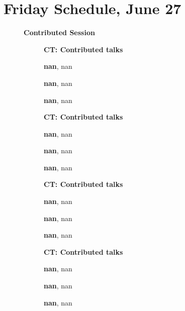 \documentclass[ILAS2025-program.tex]{subfiles}
\begin{document}
\section{Friday Schedule, June 27}
    
    \begin{description}
    \item[] \textbf{Contributed Session} 
    \begin{description}
    \item[] {\color{mstitle}\textbf{CT: Contributed talks}} 
    \item[] \textbf{nan}, nan
        \item[] \textbf{nan}, nan
        \item[] \textbf{nan}, nan
        \end{description}
    \begin{description}
    \item[] {\color{mstitle}\textbf{CT: Contributed talks}} 
    \item[] \textbf{nan}, nan
        \item[] \textbf{nan}, nan
        \item[] \textbf{nan}, nan
        \end{description}
    \begin{description}
    \item[] {\color{mstitle}\textbf{CT: Contributed talks}} 
    \item[] \textbf{nan}, nan
        \item[] \textbf{nan}, nan
        \item[] \textbf{nan}, nan
        \end{description}
    \begin{description}
    \item[] {\color{mstitle}\textbf{CT: Contributed talks}} 
    \item[] \textbf{nan}, nan
        \item[] \textbf{nan}, nan
        \item[] \textbf{nan}, nan
        \end{description}

\end{description}
\end{document}
